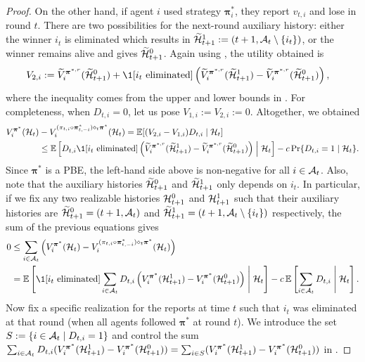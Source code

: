 \begin{proof}
On the other hand, if agent $i$ used strategy $\bm \pi_{i}^\ast$, they report $v_{t,i}$ and lose in round $t$. There are two possibilities for the next-round auxiliary history: either the winner $i_{t}$ is eliminated which results in $\widetilde{\mathcal{H}}_{t+1}^1:=(t+1,\mathcal{A}_t\setminus\{i_{t}\})$, or the winner remains alive and gives $\widetilde{\mathcal{H}}_{t+1}^0$. Again using , the utility obtained is
\begin{align*}
    V_{2,i}&:=\tilde V_i^{{\bm \pi}^{\ast,r}}(\tilde\mH_{t+1}^0) + \1[i_{t}\text{ eliminated}] \paren{ \tilde V_i^{{\bm \pi}^{\ast,r}}(\tilde\mH_{t+1}^1) - \tilde V_i^{{\bm \pi}^{\ast,r}}(\tilde\mH_{t+1}^0) },
\end{align*}
where the inequality comes from the upper and lower bounds in . For completeness, when $D_{t,i}=0$, let us pose $V_{1,i}:=V_{2,i}:=0$.
Altogether, we obtained
\begin{align*}
    V_i^{\bm\pi^\ast}(\mH_{t}) &- V_i^{(\pi_{t,i}\circ \bm \pi_{t,-i}^\ast)\diamond_t \bm \pi^\ast}(\mH_{t}) = \E[(V_{2,i}-V_{1,i})D_{t,i} \mid \mH_t]\\
    &\leq \E\sqb{D_{t,i}\1[i_t \text{ eliminated}] \paren{ \tilde V_i^{{\bm \pi}^{\ast,r}}(\tilde\mH_{t+1}^1) - \tilde V_i^{{\bm \pi}^{\ast,r}}(\tilde\mH_{t+1}^0) }\middle \vert \mH_t} - c\Pr\{D_{t,i}=1\mid\mH_t\}.
\end{align*}
Since $\bm\pi^\ast$ is a PBE, the left-hand side above is non-negative for all $i\in\mathcal{A}_t$. Also, note that the auxiliary histories $\widetilde{\mathcal{H}}_{t+1}^0$ and $\widetilde{\mathcal{H}}_{t+1}^1$ only depends on $i_t$. In particular, if we fix any two realizable histories $\mathcal{H}_{t+1}^0$ and $\mathcal{H}_{t+1}^1$ such that their auxiliary histories are $\widetilde{\mathcal{H}}_{t+1}^0=(t+1,\mathcal{A}_t)$ and $\widetilde{\mathcal{H}}_{t+1}^1=(t+1,\mathcal{A}_t\setminus\{i_t\})$ respectively, the sum of the previous equations gives
\begin{align}
    0&\leq \sum_{i\in\mA_t} \left (V_i^{\bm\pi^\ast}(\mH_{t}) - V_i^{(\pi_{t,i}\circ \bm \pi_{t,-i}^\ast)\diamond_t \bm \pi^\ast}(\mH_{t})\right ) \notag \\
    &= \E\sqb{\1[i_t \text{ eliminated}]\sum_{i\in \mA_t}  D_{t,i} \paren{   V_i^{{\bm \pi}^{\ast}}(\mH_{t+1}^1) -  V_i^{{\bm \pi}^{\ast}}(\mH_{t+1}^0) }\middle \vert\mH_t} - c\E\sqb{\sum_{i\in\mA_t}D_{t,i}\middle \vert\mH_t} .\label{eq:summed_PBE_equations}
\end{align}
Now fix a specific realization for the reports at time $t$ such that $i_t$ was eliminated at that round (when all agents followed $\bm\pi^\ast$ at round $t$). We introduce the set $S:=\{i\in\mathcal{A}_t\mid D_{t,i}=1\}$ and control the sum $\sum_{i\in \mathcal{A}_t}D_{t,i}(V_i^{\bm \pi^\ast}(\mathcal{H}_{t+1}^1)-V_i^{\bm \pi^\ast}(\mathcal{H}_{t+1}^0))=\sum_{i\in S}(V_i^{\bm \pi^\ast}(\mathcal{H}_{t+1}^1)-V_i^{\bm \pi^\ast}(\mathcal{H}_{t+1}^0))$ in .


\end{proof}
